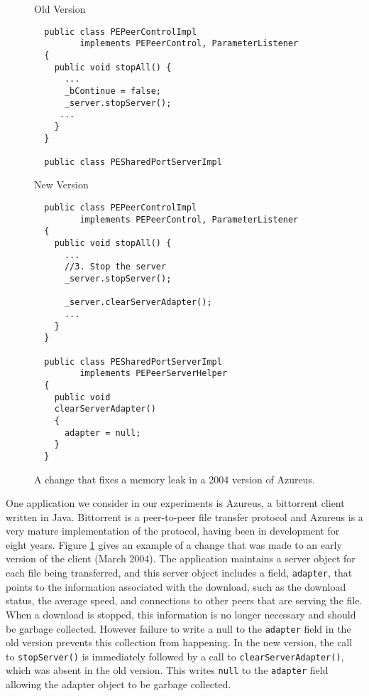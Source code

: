 \begin{figure}
\begin{minipage}{\textwidth/2}
\begin{center}
Old Version
\end{center}
\begin{verbatim}
  public class PEPeerControlImpl
         implements PEPeerControl, ParameterListener
  {
    public void stopAll() {
      ...
      _bContinue = false;
      _server.stopServer();
     ...
    }
  }

  public class PESharedPortServerImpl

\end{verbatim}
\end{minipage}
\begin{minipage}{\textwidth/2}
\begin{center}
New Version
\end{center}
\begin{verbatim}
  public class PEPeerControlImpl
         implements PEPeerControl, ParameterListener
  {
    public void stopAll() {
      ...
      //3. Stop the server
      _server.stopServer();

      _server.clearServerAdapter();
      ...
    }
  }

  public class PESharedPortServerImpl
         implements PEPeerServerHelper
  {
    public void
    clearServerAdapter()
    {
      adapter = null;
    }
  }
\end{verbatim}
\end{minipage}
\caption{\label{fig:azureus-change}A change that fixes a memory leak
  in a 2004 version of Azureus.}
\end{figure}

One application we consider in our experiments is Azureus, a
bittorrent client written in Java.  Bittorrent is a peer-to-peer file
transfer protocol and Azureus is a very mature implementation of the
protocol, having been in development for eight years.  Figure
\ref{fig:azureus-change} gives an example of a change that was made to
an early version of the client (March 2004).  The application
maintains a server object for each file being transferred, and this
server object includes a field, \texttt{adapter}, that points to the
information associated with the download, such as the download status,
the average speed, and connections to other peers that are serving the
file.  When a download is stopped, this information is no longer
necessary and should be garbage collected.  However failure to write a
null to the \texttt{adapter} field in the old version prevents this
collection from happening.  In the new version, the call to
\texttt{stopServer()} is immediately followed by a call to
\texttt{clearServerAdapter()}, which was absent in the old version.
This writes \texttt{null} to the \texttt{adapter} field allowing the
adapter object to be garbage collected.


